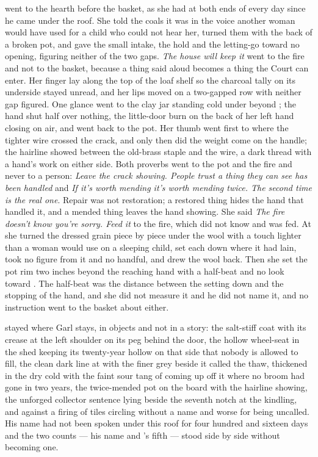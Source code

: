  went to the hearth before the basket, as she had at both ends of every day since he came under the roof. She told the coals it was  in the voice another woman would have used for a child who could not hear her, turned them with the back of a broken pot, and gave the small intake, the hold and the letting-go toward no opening, figuring neither of the two gaps. \emph{The house will keep it} went to the fire and not to the basket, because a thing said aloud becomes a thing the Court can enter. Her finger lay along the top of the loaf shelf so the charcoal tally on its underside stayed unread, and her lips moved on a two-gapped row with neither gap figured. One glance went to the clay jar standing cold under  beyond ; the hand shut half over nothing, the little-door burn on the back of her left hand closing on air, and went back to the pot. Her thumb went first to where the tighter wire crossed the crack, and only then did the weight come on the handle; the hairline showed between the old-brass staple and the wire, a dark thread with a hand's work on either side. Both proverbs went to the pot and the fire and never to a person: \emph{Leave the crack showing. People trust a thing they can see has been handled} and \emph{If it's worth mending it's worth mending twice. The second time is the real one}. Repair was not restoration; a restored thing hides the hand that handled it, and a mended thing leaves the hand showing. She said \emph{The fire doesn't know you're sorry. Feed it} to the fire, which did not know and was fed. At  she turned the dressed grain piece by piece under the wool with a touch lighter than a woman would use on a sleeping child, set each down where it had lain, took no figure from it and no handful, and drew the wool back. Then she set the pot rim two inches beyond the reaching hand with a half-beat and no look toward . The half-beat was the distance between the setting down and the stopping of the hand, and she did not measure it and he did not name it, and no instruction went to the basket about either.

 stayed where Garl stays, in objects and not in a story: the salt-stiff coat with its crease at the left shoulder on its peg behind the door, the hollow wheel-seat in the shed keeping its twenty-year hollow on that side that nobody is allowed to fill, the clean dark line at  with the finer grey beside it called the thaw, thickened in the dry cold with the faint sour tang of  coming up off it where no broom had gone in two years, the twice-mended pot on the board with the hairline showing, the unforged collector sentence lying beside the seventh notch at the kindling, and  against a firing of tiles circling without a name and worse for being uncalled. His name had not been spoken under this roof for four hundred and sixteen days and the two counts --- his name and 's fifth --- stood side by side without becoming one.

